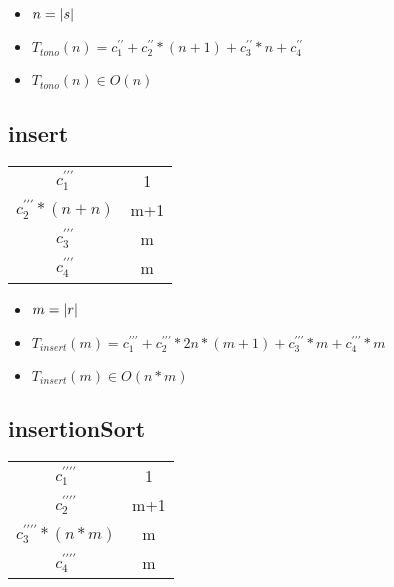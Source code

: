 \documentclass{article}
\begin{document}
    \begin{itemize}
        \item $n = |s|$
        \item $T_{tono}(n) = c^{\prime\prime}_1 + c^{\prime\prime}_2 * (n + 1) + c^{\prime\prime}_3 * n + c^{\prime\prime}_4 $
        \item $T_{tono}(n) \in O(n)$
    \end{itemize}

    \subsection*{insert}

    \begin{minipage}{0.70\textwidth}
        
    \end{minipage}
    \hfill
    \begin{minipage}{0.25\textwidth}
        \begin{tabular}{|c|c}
            $c^{\prime\prime\prime}_1$ & 1 \\
            $c^{\prime\prime\prime}_2*(n+n)$ & m+1 \\
            $c^{\prime\prime\prime}_3$ & m \\
            $c^{\prime\prime\prime}_4$ & m \\
        \end{tabular}
    \end{minipage}

    \begin{itemize}
        \item $m = |r|$
        \item $T_{insert}(m) = c^{\prime\prime\prime}_1 + c^{\prime\prime\prime}_2 * 2n * (m+1) + c^{\prime\prime\prime}_3 * m + c^{\prime\prime\prime}_4 * m $
        \item $T_{insert}(m) \in O(n*m)$
    \end{itemize}

    \subsection*{insertionSort}

    \begin{minipage}{0.70\textwidth}
        
    \end{minipage}
    \hfill
    \begin{minipage}{0.25\textwidth}
        \begin{tabular}{|c|c}

            $c^{\prime\prime\prime\prime}_1$ & 1 \\
            $c^{\prime\prime\prime\prime}_2$ & m+1 \\
            $c^{\prime\prime\prime\prime}_3*(n*m)$ & m \\
            $c^{\prime\prime\prime\prime}_4$ & m \\

        \end{tabular}
    \end{minipage}
\end{document}
